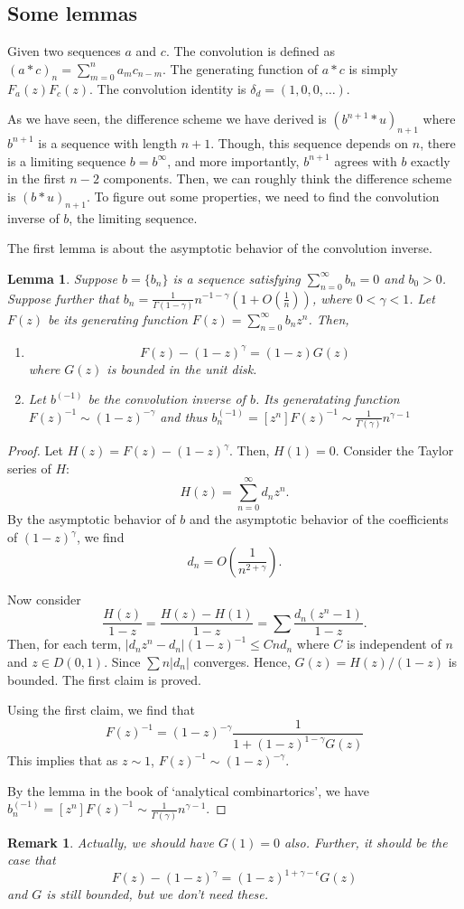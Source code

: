 \documentclass[11pt]{article}
\newtheorem{lmm}{Lemma}
\newtheorem{rmk}{Remark}
\begin{document}
\subsection{Some lemmas}

Given two sequences $a$ and $c$. The convolution is defined as $(a*c)_n=\sum_{m=0}^n a_mc_{n-m}$. The generating function of $a*c$ is simply $F_a(z)F_c(z)$. The convolution identity is $\delta_d=(1,0,0,\ldots)$.

As we have seen, the difference scheme we have derived is $(b^{n+1}*u)_{n+1}$ where $b^{n+1}$ is a sequence with length $n+1$. Though, this sequence depends on $n$, there is a limiting sequence $b=b^{\infty}$, and more importantly, $b^{n+1}$ agrees with $b$ exactly in the first $n-2$ components. Then, we can roughly think the difference scheme is $(b*u)_{n+1}$. To figure out some properties, we need to find the convolution inverse of $b$, the limiting sequence. 

The first lemma is about the asymptotic behavior of the convolution inverse.
\begin{lmm}
Suppose $b=\{b_n\}$ is a sequence satisfying $\sum_{n=0}^{\infty}b_n=0$
and $b_0>0$. Suppose further that $b_n=\frac{1}{\Gamma(1-\gamma)}n^{-1-\gamma}(1+O(\frac{1}{n}))$, where $0<\gamma<1$. Let $F(z)$ be its generating function $F(z)=\sum_{n=0}^{\infty}b_n z^n$. Then, 
\begin{enumerate}
\item $$
F(z)-(1-z)^{\gamma}=(1-z)G(z)
$$
where $G(z)$ is bounded in the unit disk.
\item Let $b^{(-1)}$ be the convolution inverse of $b$. Its generatating function $F(z)^{-1}\sim (1-z)^{-\gamma}$ and thus $b^{(-1)}_n=[z^n]F(z)^{-1}\sim \frac{1}{\Gamma(\gamma)}n^{\gamma-1}$ 
\end{enumerate}
\end{lmm}
\begin{proof}
Let $H(z)=F(z)-(1-z)^{\gamma}$. Then, $H(1)=0$. Consider the Taylor series of $H$: $$
H(z)=\sum_{n=0}^{\infty}d_n z^n.
$$
By the asymptotic behavior of $b$ and the asymptotic behavior of the coefficients of $(1-z)^{\gamma}$, we find
$$d_n=O(\frac{1}{n^{2+\gamma}}).$$ 

Now consider $$
\frac{H(z)}{1-z}=\frac{H(z)-H(1)}{1-z}=\sum \frac{d_n(z^n-1)}{1-z}.
$$
Then, for each term, 
$|d_nz^n-d_n|(1-z)^{-1}\le Cnd_n$ where $C$ is independent of $n$ and $z\in D(0,1)$. Since $\sum n|d_n|$ converges. Hence, $G(z)=H(z)/(1-z)$ is bounded. The first claim is proved.


Using the first claim, we find that $$
F(z)^{-1}=(1-z)^{-\gamma}\frac{1}{1+(1-z)^{1-\gamma}G(z)}
$$
This implies that as $z\sim 1$, $F(z)^{-1}\sim (1-z)^{-\gamma}$.

By the lemma in the book of `analytical combinartorics', we have 
$b^{(-1)}_n=[z^n]F(z)^{-1}\sim \frac{1}{\Gamma(\gamma)}n^{\gamma-1}$.
\end{proof}
\begin{rmk}
Actually, we should have $G(1)=0$ also. Further, it should be the case that 
$$
F(z)-(1-z)^{\gamma}=(1-z)^{1+\gamma-\epsilon}G(z)
$$
and $G$ is still bounded, but we don't need these.
\end{rmk}
\end{document}
